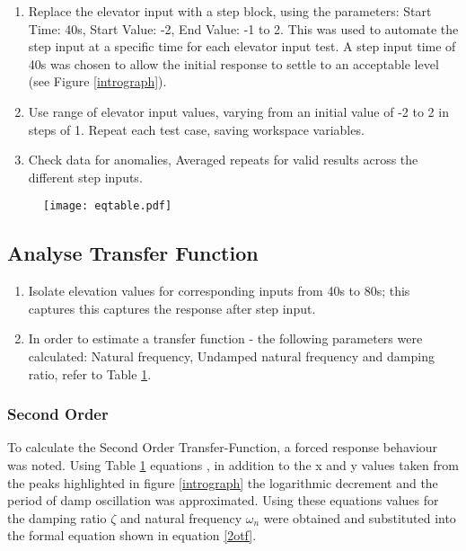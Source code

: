 \begin{enumerate}

\item
  Replace the elevator input with a step block, using the parameters:
  Start Time: 40s, Start Value: -2, End Value: -1 to 2. This was used to
  automate the step input at a specific time for each elevator input
  test. A step input time of 40s was chosen to allow the initial
  response to settle to an acceptable level (see Figure
  \ref{intrograph}).
\item
  Use range of elevator input values, varying from an initial value of
  -2 to 2 in steps of 1. Repeat each test case, saving workspace
  variables.
\item
  Check data for anomalies, Averaged repeats for valid results across
  the different step inputs.
\end{enumerate}

\begin{figure}[H]
\centering
\texttt{[image: eqtable.pdf]}
\label{eqtable}
\end{figure}

\subsection{Analyse Transfer Function}\label{analyse-transfer-function}

\begin{enumerate}

\item
  Isolate elevation values for corresponding inputs from 40s to 80s;
  this captures this captures the response after step input.
\item
  In order to estimate a transfer function - the following parameters
  were calculated: Natural frequency, Undamped natural frequency and
  damping ratio, refer to Table \ref{eqtable}.
\end{enumerate}

\subsubsection{Second Order}\label{second-order}

To calculate the Second Order Transfer-Function, a forced response
behaviour was noted. Using Table \ref{eqtable} equations \cite{vibnote}
\cite{vibnote2}, in addition to the x and y values taken from the peaks
highlighted in figure \ref{intrograph} the logarithmic decrement and the
period of damp oscillation was approximated. Using these equations
values for the damping ratio \(\zeta\) and natural frequency
\(\omega_n\) were obtained and substituted into the formal equation
shown in equation \ref{2otf}.

